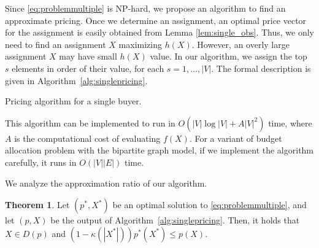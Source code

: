 \documentclass[letterpaper]{article}
\theoremstyle{definition}
\newtheorem{theorem}{Theorem}
\newcommand{\COMM}[2]{{
\begin{CJK}{UTF8}{ipxm}
\ifthenelse{\equal{#1}{TM}}{\color{blue}}{
\ifthenelse{\equal{#1}{YK}}{\color{red}}{
\ifthenelse{\equal{#1}{HS}}{\color{cyan}}{
\ifthenelse{\equal{#1}{KK}}{\color{magenta}}}}}
[#1: #2]
\end{CJK}
}}
\begin{document}
Since \eqref{eq:problemmultiple} is NP-hard, we propose an algorithm to find an approximate pricing.
Once we determine an assignment, an optimal price vector for the assignment is easily obtained from Lemma \ref{lem:single_obs}.
Thus, we only need to find an assignment $X$ maximizing $h(X)$.
However, an overly large assignment $X$ may have small $h(X)$ value.
In our algorithm, we assign the top $s$ elements in order of their value, for each $s =1, \ldots, |V|$.
The formal description is given in Algorithm~\ref{alg:singlepricing}.
\begin{algorithm}[tb]
\caption{Pricing algorithm for a single buyer.}
\label{alg:singlepricing}
\begin{algorithmic}
\end{algorithmic}
\end{algorithm}

This algorithm can be implemented to run in $O(|V| \log |V| + A |V|^2)$ time,
where $A$ is the computational cost of evaluating $f(X)$.
For a variant of budget allocation problem with the bipartite graph model,
if we implement the algorithm carefully, it runs in $O(|V| |E|)$ time.

We analyze the approximation ratio of our algorithm.
\begin{theorem}
\label{thm:singlepricing}
Let $(p^*, X^*)$ be an optimal solution to \eqref{eq:problemmultiple}, and let $(p, X)$ be the output of Algorithm~\ref{alg:singlepricing}.
Then, it holds that $X \in D(p)$ and \((1 - \kappa(|X^*|)) p^*(X^*) \le p(X)\).
\end{theorem}
\end{document}

